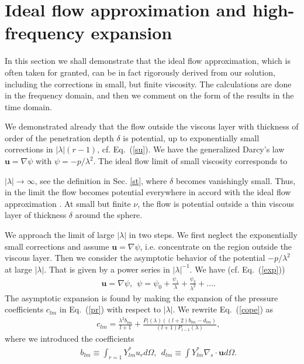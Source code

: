 \documentclass[aps,prx,twocolumn,amsmath,amssymb,amsfonts]{revtex4-2}
\begin{document}
{\section{Ideal flow approximation and high-frequency expansion}

In this section we shall demonstrate that the ideal flow approximation, which is often taken for granted, can be in fact rigorously derived from our solution, including the corrections in small, but finite viscosity. The calculations are done in the frequency domain, and then we comment on the form of the results in the time domain.

We demonstrated already that the flow outside the viscous layer with thickness of order of the penetration depth $\delta$ is potential, up to exponentially small corrections in $|\lambda|(r-1)$, cf. Eq.~(\ref{su}). We have the generalized Darcy's law $\bm u=\nabla \psi$ with $\psi=-p/\lambda^2$. The ideal flow limit of small viscosity corresponds to {$|\lambda|\rightarrow \infty$, see the definition in Sec. \ref{st}, where $\delta$ becomes vanishingly small. Thus, in the limit the flow becomes potential everywhere in accord with the ideal flow approximation \cite{bat}. At small but finite $\nu$, the flow is potential outside a thin viscous layer of thickness $\delta$ around the sphere.

We approach the limit of large $|\lambda|$ in two steps. We first neglect the exponentially small corrections and assume $\bm u=\nabla \psi$, i.e. concentrate on the region outside the viscous layer. Then we consider the asymptotic behavior of the potential $-p/\lambda^2$ at large $|\lambda|$. That is given by a power series in $|\lambda|^{-1}$. We have (cf. Eq.~(\ref{exp}))
\begin{eqnarray}&&
\bm u=\nabla \psi,\ \ \psi=\psi_0+\frac{\psi_1}{\lambda}+\frac{\psi_2}{\lambda^2}+\ldots. \label{id}
\end{eqnarray}
The asymptotic expansion is found by making the expansion of the pressure coefficients $c_{lm}$ in Eq.~(\ref{pr}) with respect to $|\lambda|$. We rewrite Eq.~(\ref{cope}) as
\begin{eqnarray}&&
c_{lm}\!=\!\frac{ \lambda^2 b_{lm}}{l\!+\!1}+\frac{P_l(\lambda)\left((l+2)b_{lm}-d_{lm}\right)}{(l\!+\!1) P_{l-1}(\lambda)}, \label{sak}
\end{eqnarray}
where we introduced the coefficients
\begin{eqnarray}&&\!\!\!\!\!\!\!\!\!
b_{lm}\equiv \int_{r=1}Y_{lm}^* u_r d\Omega,\ \  d_{lm}\equiv \int  Y_{lm}^* \nabla_s\!\cdot\!\bm u d\Omega. \label{b}
\end{eqnarray}


}}
\end{document}
